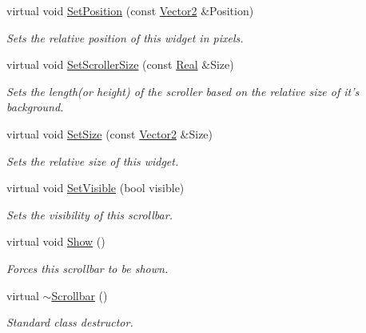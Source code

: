 \begin{DoxyCompactItemize}
virtual void \hyperlink{classphys_1_1UI_1_1Scrollbar_a4a87f32e31e8e4443c4aaec46307864e}{SetPosition} (const \hyperlink{classphys_1_1Vector2}{Vector2} \&Position)
\begin{DoxyCompactList}\small\item\em Sets the relative position of this widget in pixels. \item\end{DoxyCompactList}\item 
virtual void \hyperlink{classphys_1_1UI_1_1Scrollbar_a4bd103fd17411e5abc6a8c731ccb9183}{SetScrollerSize} (const \hyperlink{namespacephys_af7eb897198d265b8e868f45240230d5f}{Real} \&Size)
\begin{DoxyCompactList}\small\item\em Sets the length(or height) of the scroller based on the relative size of it's background. \item\end{DoxyCompactList}\item 
virtual void \hyperlink{classphys_1_1UI_1_1Scrollbar_a5581675d3f250ed7270018e184b02b1d}{SetSize} (const \hyperlink{classphys_1_1Vector2}{Vector2} \&Size)
\begin{DoxyCompactList}\small\item\em Sets the relative size of this widget. \item\end{DoxyCompactList}\item 
virtual void \hyperlink{classphys_1_1UI_1_1Scrollbar_a2d8997e0bbbb1c17af5128fea98fb1e4}{SetVisible} (bool visible)
\begin{DoxyCompactList}\small\item\em Sets the visibility of this scrollbar. \item\end{DoxyCompactList}\item 
\hypertarget{classphys_1_1UI_1_1Scrollbar_a42955ae0e2b273ca9ea392a8dbc62604}{
virtual void \hyperlink{classphys_1_1UI_1_1Scrollbar_a42955ae0e2b273ca9ea392a8dbc62604}{Show} ()}
\label{classphys_1_1UI_1_1Scrollbar_a42955ae0e2b273ca9ea392a8dbc62604}

\begin{DoxyCompactList}\small\item\em Forces this scrollbar to be shown. \item\end{DoxyCompactList}\item 
\hypertarget{classphys_1_1UI_1_1Scrollbar_af9fb189c7856353a930c0a228fc0cf42}{
virtual \hyperlink{classphys_1_1UI_1_1Scrollbar_af9fb189c7856353a930c0a228fc0cf42}{$\sim$Scrollbar} ()}
\label{classphys_1_1UI_1_1Scrollbar_af9fb189c7856353a930c0a228fc0cf42}

\begin{DoxyCompactList}\small\item\em Standard class destructor. \item\end{DoxyCompactList}\end{DoxyCompactItemize}
